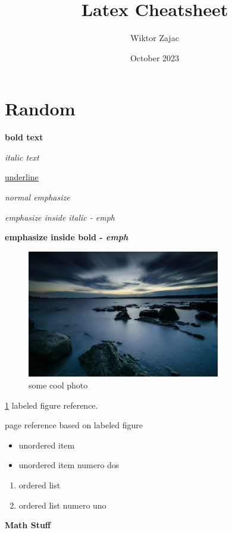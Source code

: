 \documentclass[12pt, a4paper]{article} %
\title{Latex Cheatsheet}
\author{Wiktor Zajac}
\date{October 2023}
\begin{document}
\maketitle
\vspace{5mm}

\section{Random}

\textbf{bold text}

\textit{italic text}

\underline{underline}

\emph{normal emphasize}

\textit{emphasize inside italic - \emph{emph}}

\textbf{emphasize inside bold - \emph{emph}}


\begin{figure}[h]
	\centering
	\includegraphics[width=0.75\textwidth]{image}
	\caption{some cool photo}
	\label{fig:image}
\end{figure}


\ref{fig:image} labeled figure reference.

\pageref{fig:image} page reference based on labeled figure


\begin{itemize}
	\item unordered item
	\item unordered item numero dos
\end{itemize}

\begin{enumerate}
	\item ordered list
	\item ordered list numero uno
\end{enumerate}

\textbf{Math Stuff}
\end{document}
